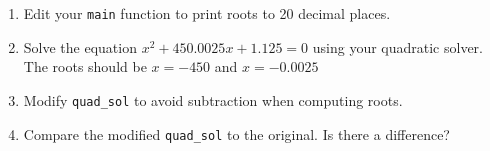 \documentclass[a4paper,12pt]{article}
\begin{document}
\begin{enumerate}
\begin{enumerate}
\item Edit your \texttt{main} function to print roots to 20 decimal places.
\item Solve the equation $x^2 + 450.0025x + 1.125 = 0$ using your quadratic solver. The roots should be $x = -450$ and $x = -0.0025$
\item Modify {\tt quad\_sol} to avoid subtraction when computing roots.
\item Compare the modified {\tt quad\_sol} to the original. Is there a difference?
\end{enumerate}
\end{enumerate}
\end{document}
